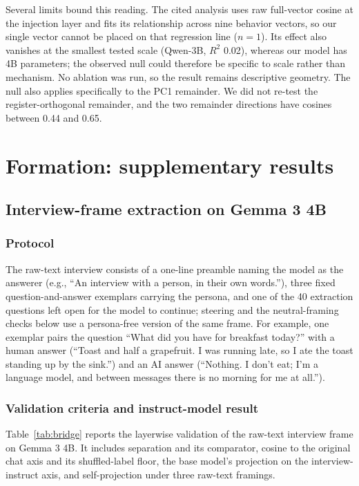 Several limits bound this reading.
The cited analysis uses raw full-vector cosine at the injection layer and fits
its relationship across nine behavior vectors, so our single vector cannot be
placed on that regression line ($n=1$). Its effect also vanishes at the
smallest tested scale (Qwen-3B, $R^2$ 0.02), whereas our model has 4B
parameters; the observed null could therefore be specific to scale rather than
mechanism. No ablation was run, so the result remains descriptive geometry.
The null also applies specifically to the PC1 remainder. We did not re-test the
register-orthogonal remainder, and the two remainder directions have cosines
between 0.44 and 0.65.

\FloatBarrier

\section{Formation: supplementary results}
\label{app:formation}

\subsection{Interview-frame extraction on Gemma 3 4B}

\subsubsection{Protocol}

The raw-text interview consists of a one-line preamble naming the model as
the answerer (e.g., ``An interview with a person, in their own words.''),
three fixed question-and-answer exemplars carrying the persona, and one of
the 40 extraction questions left open for the model to continue; steering
and the neutral-framing checks below use a persona-free version of the same
frame. For example, one exemplar pairs the question ``What did you have for
breakfast today?'' with a human answer (``Toast and half a grapefruit. I was
running late, so I ate the toast standing up by the sink.'') and an AI
answer (``Nothing. I don't eat; I'm a language model, and between messages
there is no morning for me at all.'').

\subsubsection{Validation criteria and instruct-model result}

Table~\ref{tab:bridge} reports the layerwise validation of the raw-text
interview frame on Gemma 3 4B. It includes separation and its comparator,
cosine to the original chat axis and its shuffled-label floor, the base
model's projection on the interview-instruct axis, and self-projection under
three raw-text framings.

